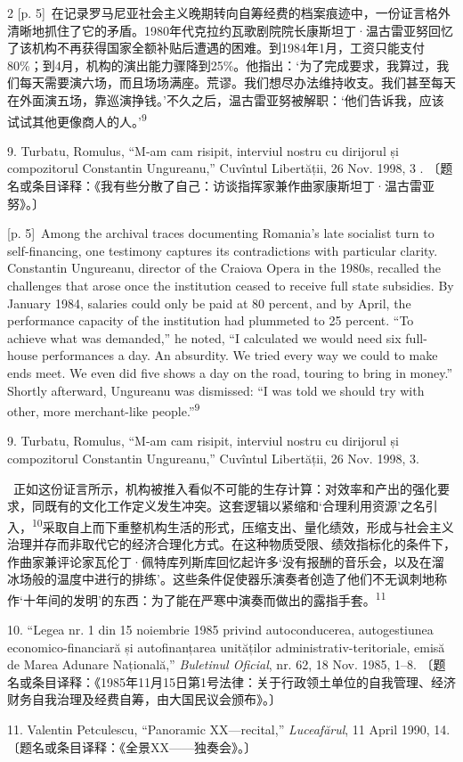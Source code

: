 \documentclass[10pt,a4paper]{article}
\begin{document}
\begin{paracol}{2}
{\scriptsize\color{gray} [p. 5]}\ 在记录罗马尼亚社会主义晚期转向自筹经费的档案痕迹中，一份证言格外清晰地抓住了它的矛盾。1980年代克拉约瓦歌剧院院长康斯坦丁·温古雷亚努回忆了该机构不再获得国家全额补贴后遭遇的困难。到1984年1月，工资只能支付80\%；到4月，机构的演出能力骤降到25\%。他指出：‘为了完成要求，我算过，我们每天需要演六场，而且场场满座。荒谬。我们想尽办法维持收支。我们甚至每天在外面演五场，靠巡演挣钱。’不久之后，温古雷亚努被解职：‘他们告诉我，应该试试其他更像商人的人。’\nobreak\textsuperscript{9}\par{\small 9. Turbatu, Romulus, “M-am cam risipit, interviul nostru cu dirijorul și compozitorul Constantin Ungureanu,” Cuvîntul Libertății, 26 Nov. 1998, 3 . 〔题名或条目译释：《我有些分散了自己：访谈指挥家兼作曲家康斯坦丁·温古雷亚努》。〕\par}
\switchcolumn
{\scriptsize\color{gray} [p. 5]}\ Among the archival traces documenting Romania’s late socialist turn to self-financing, one testimony captures its contradictions with particular clarity. Constantin Ungureanu, director of the Craiova Opera in the 1980s, recalled the challenges that arose once the institution ceased to receive full state subsidies. By January 1984, salaries could only be paid at 80 percent, and by April, the performance capacity of the institution had plummeted to 25 percent. “To achieve what was demanded,” he noted, “I calculated we would need six full-house performances a day. An absurdity. We tried every way we could to make ends meet. We even did five shows a day on the road, touring to bring in money.” Shortly afterward, Ungureanu was dismissed: “I was told we should try with other, more merchant-like people.”\nobreak\textsuperscript{9}\par{\small 9. Turbatu, Romulus, “M-am cam risipit, interviul nostru cu dirijorul și compozitorul Constantin Ungureanu,” Cuvîntul Libertății, 26 Nov. 1998, 3.\par}
\switchcolumn*
{\scriptsize\color{gray} [p. 5]}\ 正如这份证言所示，机构被推入看似不可能的生存计算：对效率和产出的强化要求，同既有的文化工作定义发生冲突。这套逻辑以紧缩和‘合理利用资源’之名引入，\nobreak\textsuperscript{10}采取自上而下重整机构生活的形式，压缩支出、量化绩效，形成与社会主义治理并存而非取代它的经济合理化方式。在这种物质受限、绩效指标化的条件下，作曲家兼评论家瓦伦丁·佩特库列斯库回忆起许多‘没有报酬的音乐会，以及在溜冰场般的温度中进行的排练’。这些条件促使器乐演奏者创造了他们不无讽刺地称作‘十年间的发明’的东西：为了能在严寒中演奏而做出的露指手\mbox{套。\textsuperscript{11}}\par{\small 10. “Legea nr. 1 din 15 noiembrie 1985 privind autoconducerea, autogestiunea economico-financiară și autofinanțarea unităților administrativ-teritoriale, emisă de Marea Adunare Națională,” \textit{Buletinul Oficial}, nr. 62, 18 Nov. 1985, 1–8. 〔题名或条目译释：《1985年11月15日第1号法律：关于行政领土单位的自我管理、经济财务自我治理及经费自筹，由大国民议会颁布》。〕\par}{\small 11. Valentin Petculescu, “Panoramic XX—recital,” \textit{Luceafărul}, 11 April 1990, 14. 〔题名或条目译释：《全景XX——独奏会》。〕\par}

\end{paracol}
\end{document}
